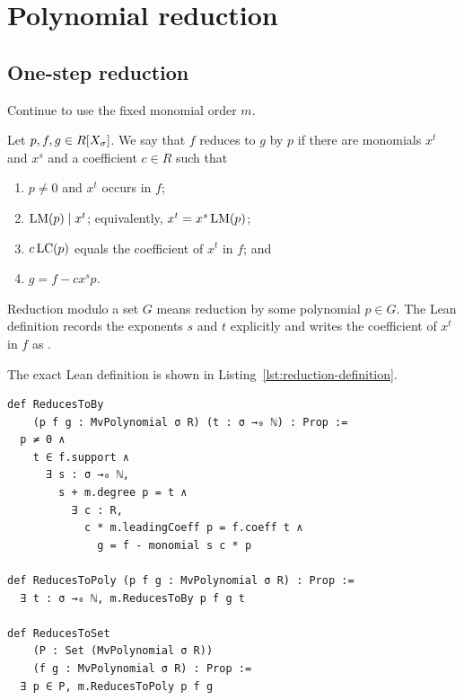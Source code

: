 \section{Polynomial reduction}\label{sec:polynomial-reduction}

\subsection{One-step reduction}

Continue to use the fixed monomial order $m$.

\begin{definition}
\label{def:one-step-reduction}
Let $p,f,g\in R[X_\sigma]$.  We say that $f$ reduces to $g$ by $p$ if
there are monomials $x^t$ and $x^s$ and a coefficient $c\in R$ such that
\begin{enumerate}[label=(\roman*),leftmargin=2em]
  \item $p\neq0$ and $x^t$ occurs in $f$;
  \item $\operatorname{LM}(p)\mid x^t$; equivalently, $x^t=x^s\operatorname{LM}(p)$;
  \item $c\operatorname{LC}(p)$ equals the coefficient of $x^t$ in $f$; and
  \item $g=f-cx^s p$.
\end{enumerate}
Reduction modulo a set $G$ means reduction by some polynomial $p\in G$.
The Lean definition records the exponents $s$ and $t$ explicitly and writes
the coefficient of $x^t$ in $f$ as .
\end{definition}

The exact Lean definition is shown in
Listing~\ref{lst:reduction-definition}.

\begin{lstlisting}[style=lean,caption={One-step polynomial reduction and its existential closures.},label={lst:reduction-definition}]
def ReducesToBy
    (p f g : MvPolynomial σ R) (t : σ →₀ ℕ) : Prop :=
  p ≠ 0 ∧
    t ∈ f.support ∧
      ∃ s : σ →₀ ℕ,
        s + m.degree p = t ∧
          ∃ c : R,
            c * m.leadingCoeff p = f.coeff t ∧
              g = f - monomial s c * p

def ReducesToPoly (p f g : MvPolynomial σ R) : Prop :=
  ∃ t : σ →₀ ℕ, m.ReducesToBy p f g t

def ReducesToSet
    (P : Set (MvPolynomial σ R))
    (f g : MvPolynomial σ R) : Prop :=
  ∃ p ∈ P, m.ReducesToPoly p f g
\end{lstlisting}

